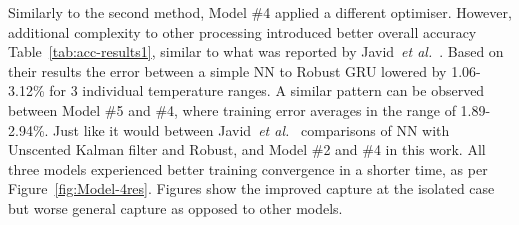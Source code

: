 %
%
Similarly to the second method, Model \#4 applied a different optimiser.
However, additional complexity to other processing introduced better overall accuracy Table~\ref{tab:acc-results1}, similar to what was reported by Javid~\textit{et al.}~\cite{javid_adaptive_2020}.
Based on their results the error between a simple NN to Robust GRU lowered by 1.06-3.12\% for 3 individual temperature ranges.
A similar pattern can be observed between Model \#5 and \#4, where training error averages in the range of 1.89-2.94\%.
Just like it would between Javid~\textit{et al.}~\cite{javid_adaptive_2020} comparisons of NN with Unscented Kalman filter and Robust, and Model \#2 and \#4 in this work.
All three models experienced better training convergence in a shorter time, as per Figure~\ref{fig:Model-4res}.
Figures show the improved capture at the isolated case but worse general capture as opposed to other models.

